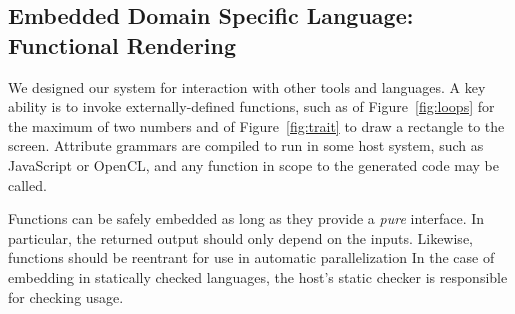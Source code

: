 \subsection{Embedded Domain Specific Language: Functional Rendering}
We designed our system for interaction with other tools and languages. A key ability is to invoke externally-defined functions, such as   of Figure~\ref{fig:loops} for the maximum of two numbers and  of Figure~\ref{fig:trait} to draw a rectangle to the screen. Attribute grammars are compiled to run in some host system, such as JavaScript or OpenCL, and any function in scope to the generated code may be called.

Functions can be safely embedded as long as they provide a \emph{pure} interface. In particular, the returned output should only depend on the inputs. Likewise, functions should be reentrant for use in automatic parallelization In the case of embedding in statically checked languages, the host's static checker is responsible for checking usage.



